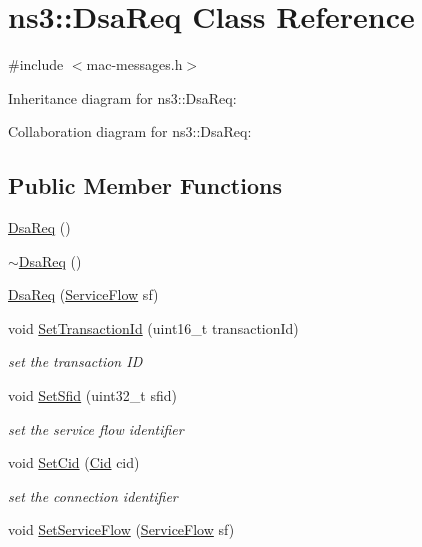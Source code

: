 \hypertarget{classns3_1_1DsaReq}{}\section{ns3\+:\+:Dsa\+Req Class Reference}
\label{classns3_1_1DsaReq}


{\ttfamily \#include $<$mac-\/messages.\+h$>$}



Inheritance diagram for ns3\+:\+:Dsa\+Req\+:


Collaboration diagram for ns3\+:\+:Dsa\+Req\+:
\subsection*{Public Member Functions}
\begin{DoxyCompactItemize}
\item 
\hyperlink{classns3_1_1DsaReq_a925502b86fe6808917ab188e7080562b}{Dsa\+Req} ()
\item 
\hyperlink{classns3_1_1DsaReq_ab01f8efb43bd636fee101a7159d10c00}{$\sim$\+Dsa\+Req} ()
\item 
\hyperlink{classns3_1_1DsaReq_a4a5b9e908217fe8be14eda5be1eac769}{Dsa\+Req} (\hyperlink{classns3_1_1ServiceFlow}{Service\+Flow} sf)
\item 
void \hyperlink{classns3_1_1DsaReq_a41a82c7130a5c6b082fe10665f1c94fe}{Set\+Transaction\+Id} (uint16\+\_\+t transaction\+Id)
\begin{DoxyCompactList}\small\item\em set the transaction ID \end{DoxyCompactList}\item 
void \hyperlink{classns3_1_1DsaReq_adc6768faba2ea79d748180b40a1a932b}{Set\+Sfid} (uint32\+\_\+t sfid)
\begin{DoxyCompactList}\small\item\em set the service flow identifier \end{DoxyCompactList}\item 
void \hyperlink{classns3_1_1DsaReq_ae9f801731e583d4772364476f76b51ae}{Set\+Cid} (\hyperlink{classns3_1_1Cid}{Cid} cid)
\begin{DoxyCompactList}\small\item\em set the connection identifier \end{DoxyCompactList}\item 
void \hyperlink{classns3_1_1DsaReq_acdb15a943844799b0867e0a4548f3a73}{Set\+Service\+Flow} (\hyperlink{classns3_1_1ServiceFlow}{Service\+Flow} sf)

\end{DoxyCompactItemize}

